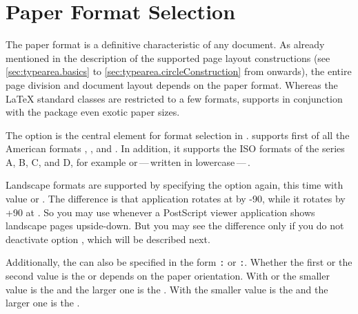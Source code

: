 \section{Paper Format Selection}
%
\BeginIndexGroup
{}%

The paper format is a definitive characteristic of any document. As
already mentioned in the description of the supported page layout
constructions (see \autoref{sec:typearea.basics} to
\autoref{sec:typearea.circleConstruction} from
 onwards), the entire page division
and document layout depends on the paper format. Whereas the {\LaTeX}
standard classes are restricted to a few formats, {\KOMAScript}
supports in conjunction with the  package even
exotic paper sizes.


\begin{Declaration}
\end{Declaration}%
The option  is the
central element for format selection in \KOMAScript.  
supports first of all the American formats ,
, and . In addition, it supports the
ISO formats of the series A, B, C, and D, for example 
or\,---\,written in lowercase\,---\,. 

Landscape formats are supported by specifying the option again, this time with
value  or
. The difference is
that application  rotates at  by
-90\Unit{\textdegree}, while it rotates by +90\Unit{\textdegree} at
. So you may use  whenever a PostScript
viewer application shows landscape pages upside-down. But you may see the
difference only if you do not deactivate option
, which will be described next.

Additionally, the  can
also be specified in the form \texttt{:} or
\texttt{:}.
Whether the first or the second value is
the  or  depends on the paper orientation. With
 or  the smaller
value is the  and the larger one is the . With
 the smaller value is the  and the
larger one is the .

